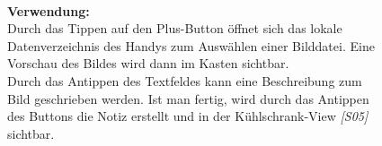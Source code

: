 \documentclass[a4paper]{scrreprt}
\begin{document}
\begin{figure}[h]
\begin{minipage}[b]{0.65\linewidth}
\begin{itemize}
    			\end{itemize}
    			
    			\hfill
    			\\
    			
    			\textbf{Verwendung:}\\
    			Durch das Tippen auf den Plus-Button öffnet 
    			sich das lokale Datenverzeichnis des Handys 
    			zum Auswählen einer Bilddatei. Eine Vorschau 
    			des Bildes wird dann im Kasten sichtbar.\\ 
    			Durch
    			das Antippen des Textfeldes kann eine
    			Beschreibung zum Bild geschrieben werden. Ist
    			man fertig, wird durch das Antippen des Buttons  
    			die Notiz erstellt und in der Kühlschrank-View 
    			\textit{{[}S05{]}} sichtbar. 
    			
    			\vspace{1mm}
    			
    		\end{minipage}
    	\end{figure}
    	
\end{document}
